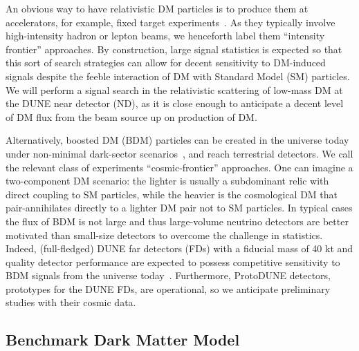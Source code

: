 An obvious way to have relativistic DM particles is to produce them at accelerators, for example, fixed target experiments~\cite{Alexander:2016aln, Battaglieri:2017aum, LoSecco:1980nf, Acciarri:2015uup}. 
As they typically involve high-intensity hadron or lepton beams, we henceforth label them ``intensity frontier'' approaches. 
By construction, large signal statistics is expected so that this sort of search strategies can allow for decent sensitivity to DM-induced signals despite the feeble interaction of DM with Standard Model (SM) particles.\\
We will perform a signal search in the relativistic scattering of low-mass DM at the DUNE near detector (ND), as it is close enough to anticipate a decent level of DM flux from the beam source up on production of DM. 

Alternatively, boosted DM (BDM) particles can be created in the universe today under non-minimal dark-sector scenarios~\cite{Agashe:2014yua,Belanger:2011ww}, and reach terrestrial detectors.
We call the relevant class of experiments ``cosmic-frontier'' approaches. 
One can imagine a two-component DM scenario: the lighter is usually a subdominant relic with direct coupling to SM particles, while the heavier is the cosmological DM that pair-annihilates directly to a lighter DM pair not to SM particles. 
In typical cases the flux of BDM is not large and thus large-volume neutrino detectors are better motivated than small-size detectors to overcome the challenge in statistics.
Indeed, (full-fledged) DUNE far detectors (FDs) with a fiducial mass of 40 kt and quality detector performance are expected to possess competitive sensitivity to BDM signals from the universe today~\cite{Kim:2016zjx}. 
Furthermore, ProtoDUNE detectors, prototypes for the DUNE FDs, are operational, so we anticipate preliminary studies with their cosmic data.   
\subsection{Benchmark Dark Matter Model}
\label{sec:model}

